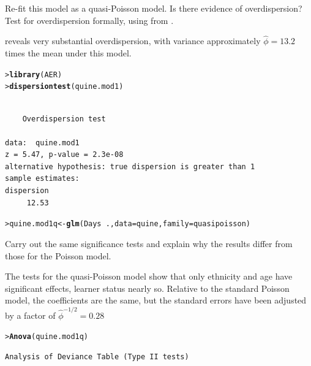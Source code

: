 \documentclass[10pt]{report}\usepackage[]{graphicx}\usepackage[]{color}
\makeatletter
\newcommand{\hlopt}[1]{\textcolor[rgb]{0,0,0}{#1}}%
\newcommand{\hlstd}[1]{\textcolor[rgb]{0.345,0.345,0.345}{#1}}%
\newcommand{\hlkwb}[1]{\textcolor[rgb]{0.69,0.353,0.396}{#1}}%
\newcommand{\hlkwc}[1]{\textcolor[rgb]{0.333,0.667,0.333}{#1}}%
\newcommand{\hlkwd}[1]{\textcolor[rgb]{0.737,0.353,0.396}{\textbf{#1}}}%
\newenvironment{kframe}{%
 \def\at@end@of@kframe{}%
 \ifinner\ifhmode%
  \def\at@end@of@kframe{\end{minipage}}%
  \begin{minipage}{\columnwidth}%
 \fi\fi%
 \def\FrameCommand##1{\hskip\@totalleftmargin \hskip-\fboxsep
 \colorbox{shadecolor}{##1}\hskip-\fboxsep
     \hskip-\linewidth \hskip-\@totalleftmargin \hskip\columnwidth}%
 \MakeFramed {\advance\hsize-\width
   \@totalleftmargin\z@ \linewidth\hsize
   \@setminipage}}%
 {\par\unskip\endMakeFramed%
 \at@end@of@kframe}
\newenvironment{knitrout}{}{} %
\renewenvironment{knitrout}{\small\renewcommand{\baselinestretch}{.85}}{} %
\makeatother
\begin{document}
\begin{Exercises}
\begin{enumerate*}
\begin{ans}
\begin{knitrout}
\end{knitrout}

    \end{ans}
    
    \item Re-fit this model as a quasi-Poisson model.  Is there evidence of overdispersion?
    Test for overdispersion formally, using  from .
    \begin{ans}
     reveals very substantial overdispersion, with variance approximately
    $\widehat{\phi} =13.2$ times the mean under this model.
\begin{knitrout}\footnotesize
{}\color{fgcolor}\begin{kframe}
\begin{alltt}
\hlstd{> }\hlkwd{library}\hlstd{(AER)}
\hlstd{> }\hlkwd{dispersiontest}\hlstd{(quine.mod1)}
\end{alltt}
\begin{verbatim}

	Overdispersion test

data:  quine.mod1
z = 5.47, p-value = 2.3e-08
alternative hypothesis: true dispersion is greater than 1
sample estimates:
dispersion 
     12.53 
\end{verbatim}
\begin{alltt}
\hlstd{> }\hlstd{quine.mod1q} \hlkwb{<-} \hlkwd{glm}\hlstd{(Days} \hlopt{~} \hlstd{.,} \hlkwc{data}\hlstd{=quine,} \hlkwc{family}\hlstd{=quasipoisson)}
\end{alltt}
\end{kframe}
\end{knitrout}

    \end{ans}
    
    \item Carry out the same significance tests and explain why the results differ from those 
    for the Poisson model.
    \begin{ans}
    The  tests for the quasi-Poisson model  show that only
    ethnicity and age have significant effects, learner status nearly so.
    Relative to the standard Poisson model, the coefficients are the same, but
    the standard errors have been adjusted by a factor of $\widehat{\phi} ^ {-1/2} = 0.28$
\begin{knitrout}\footnotesize
{}\color{fgcolor}\begin{kframe}
\begin{alltt}
\hlstd{> }\hlkwd{Anova}\hlstd{(quine.mod1q)}
\end{alltt}
\begin{verbatim}
Analysis of Deviance Table (Type II tests)


\end{verbatim}
\end{kframe}
\end{knitrout}
\end{ans}
\end{enumerate*}
\end{Exercises}
\end{document}
